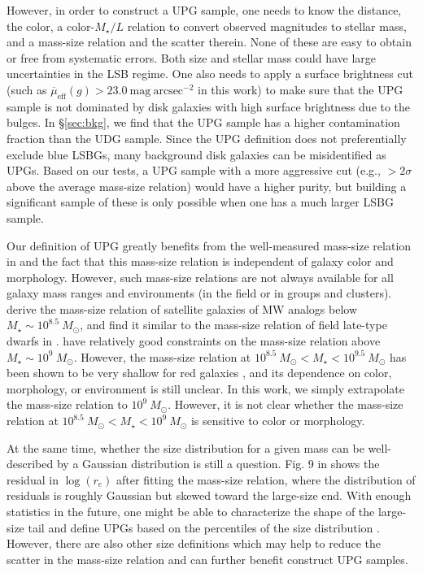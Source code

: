 \documentclass[twocolumn,astrosymb,twocolappendix,linenumbers]{aastex631}
\newcommand{\sbunit}{\mathrm{mag\ arcsec}^{-2}}
\newcommand{\sbeff}{\overline{\mu}_{\mathrm{eff}}(g)}
\begin{document}
\begin{CJK*}{UTF8}{gbsn}
However, in order to construct a UPG sample, one needs to know the distance, the color, a color-$M_\star/L$ relation to convert observed magnitudes to stellar mass, and a mass-size relation and the scatter therein. None of these are easy to obtain or free from systematic errors. Both size and stellar mass could have large uncertainties in the LSB regime. One also needs to apply a surface brightness cut (such as $\sbeff > 23.0\ \sbunit$ in this work) to make sure that the UPG sample is not dominated by disk galaxies with high surface brightness due to the bulges. In \S\ref{sec:bkg}, we find that the UPG sample has a higher contamination fraction than the UDG sample. Since the UPG definition does not preferentially exclude blue LSBGs, many background disk galaxies can be misidentified as UPGs. Based on our tests, a UPG sample with a more aggressive cut (e.g., $>2\sigma$ above the average mass-size relation) would have a higher purity, but building a significant sample of these is only possible when one has a much larger LSBG sample.

Our definition of UPG greatly benefits from the well-measured mass-size relation in \citet{ELVES-I} and the fact that this mass-size relation is independent of galaxy color and morphology. However, such mass-size relations are not always available for all galaxy mass ranges and environments (in the field or in groups and clusters). \citet{ELVES-I} derive the mass-size relation of satellite galaxies of MW analogs below $M_\star \sim 10^{8.5}\ M_\odot$, and find it similar to the mass-size relation of field late-type dwarfs in \citet{Karachentsev2013}. \citet{Lange2015} have relatively good constraints on the mass-size relation above $M_\star \sim 10^{9}\ M_\odot$. However, the mass-size relation at $10^{8.5}\ M_\odot < M_\star < 10^{9.5}\ M_\odot$ has been shown to be very shallow for red galaxies \citep{SmithCastelli2008,Misgeld2008,Misgeld2011,Eigenthaler2018}, and its dependence on color, morphology, or environment is still unclear. In this work, we simply extrapolate the \citet{ELVES-I} mass-size relation to $10^9\ M_\odot$. However, it is not clear whether the mass-size relation at $10^{8.5}\ M_\odot < M_\star < 10^{9}\ M_\odot$ is sensitive to color or morphology. 

At the same time, whether the size distribution for a given mass can be well-described by a Gaussian distribution is still a question. Fig. 9 in \citet{ELVES-I} shows the residual in $\log(r_e)$ after fitting the mass-size relation, where the distribution of residuals is roughly Gaussian but skewed toward the large-size end. With enough statistics in the future, one might be able to characterize the shape of the large-size tail and define UPGs based on the percentiles of the size distribution \citep{Greene2022}. However, there are also other size definitions which may help to reduce the scatter in the mass-size relation \citep[e.g.,][]{Miller2019,Mowla2019,Trujillo2020,Chamba2022} and can further benefit construct UPG samples. 


\end{CJK*}
\end{document}
